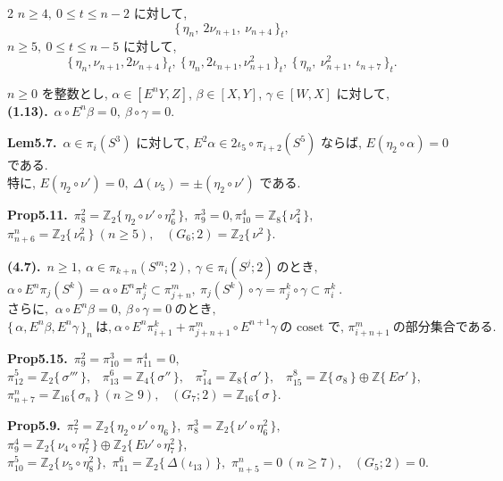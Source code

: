 \documentclass[10pt, leqno]{ltjsarticle}
\newcommand{\Ex}{E}        %
\newcommand{\todai}[2][]{\{\,#2\,\}_{#1}}      %
\newcommand{\gen}[1]{\{\,#1\,\}}       %
\newcommand{\pis}[2]{\pi_{#1}(#2)}       %
\newcommand{\pit}[2]{\pi_{#1}^{#2}}
\numberwithin{equation}{section}
\theoremstyle{plain}
\theoremstyle{definition}
\theoremstyle{remark}
\begin{document}
\begin{paracol}{2}
\noindent
\(n\ge4,\ 0\le t\le n-2\) に対して, 
\[
\todai[t]{\eta_n,\ 2\nu_{n+1},\ \nu_{n+4}},
\]
\(n\ge5,\ 0\le t\le n-5\) に対して, 
\[
\todai[t]{\eta_n, \nu_{n+1}, 2\nu_{n+4}},\
\todai[t]{\eta_n, 2\iota_{n+1}, \nu_{n+1}^2},\
\todai[t]{\eta_n,\ \nu_{n+1}^{2},\ \iota_{n+7}} .
\]

\switchcolumn

\noindent
$n\ge 0$ を整数とし, 
$\alpha\in[\Ex^n Y, Z]$, $\beta\in[X, Y]$, $\gamma\in[W, X]$ に対して,\\
\textbf{(1.13).}\
\(\alpha\circ \Ex^n\beta=0,\ \beta\circ \gamma=0\).

\noindent
\textbf{Lem5.7.}\
\(\alpha\in\pi_i(S^3)\) に対して,
\(E^2\alpha\in2\iota_5\circ\pi_{i+2}(S^5)\) ならば, 
\(E(\eta_2\circ\alpha)=0\) である. \\
特に, \(E(\eta_2\circ\nu')=0, \ \Delta(\nu_5)=\pm(\eta_2\circ\nu')\) である. 

\noindent
\textbf{Prop5.11.}\
\(\pi^{2}_{8}=\mathbb Z_2\gen{\eta_{2}\circ\nu'\circ\eta_6^2},\)\quad 
\(\pi^{3}_{9}=0,\)\quad \(\pi^{4}_{10}=\mathbb Z_8\gen{\nu_{4}^2},\) \\
\(\pi^{n}_{n+6}=\mathbb Z_2\gen{\nu_n^2}\ (n\ge5),\) \
\((G_{6};2)=\mathbb Z_2\gen{\nu^2}.\)

\noindent
\textbf{(4.7).}\
\(n\ge1, \ \alpha\in\pis{k+n}{S^m; 2},\ \gamma\in\pis{i}{S^j; 2}
    \ \text{のとき, }\)\\
\(\alpha\circ E^n\pis{j}{S^k} = \alpha\circ E^n \pit{j}{k}
  \subset \pit{j+n}{m},
  \ \pis{j}{S^k}\circ\gamma = \pit{j}{k}\circ\gamma \subset\pit{i}{k}\ . \)\\
\(\text{さらに, }\ \alpha\circ E^n\beta=0,\ \beta\circ\gamma = 0 \ \text{のとき, }\)\\
\(\todai[n]{\alpha, E^n\beta, E^n\gamma}\ \text{は,}\
  \alpha\circ E^n\pit{i+1}{k} + \pit{j+n+1}{m}\circ E^{n+1}\gamma\
  \text{の coset で, }\pit{i+n+1}{m} \ \text{の部分集合である. }\)

\noindent
\textbf{Prop5.15.}\
\(\pi_9^2=\pi_{10}^3=\pi_{11}^4=0,\) \\
\(\pi^{5}_{12}=\mathbb Z_2\gen{\sigma'''},\) \
\(\pi^{6}_{13}=\mathbb Z_4\gen{\sigma''},\) \
\(\pi^{7}_{14}=\mathbb Z_8\gen{\sigma'},\) \
\(\pi^{8}_{15}=\mathbb Z\gen{\sigma_8}\oplus\mathbb Z\gen{E\sigma'},\) \\
\(\pi^{n}_{n+7}=\mathbb Z_{16}\gen{\sigma_n}\ (n\ge9),\) \
\((G_{7};2)=\mathbb Z_{16}\gen{\sigma}.\)

\noindent
\textbf{Prop5.9.}\
\(\pi^{2}_{7}=\mathbb Z_2\gen{\eta_{2}\circ\nu'\circ\eta_6},\) \quad
\(\pi^{3}_{8}=\mathbb Z_2\gen{\nu'\circ\eta_6^2},\) \quad
\(\pi^{4}_{9}=\mathbb Z_2\gen{\nu_{4}\circ\eta_7^2}\oplus \mathbb Z_2\gen{E\nu'\circ\eta_7^2},\) \\
\(\pi^{5}_{10}=\mathbb Z_2\gen{\nu_{5}\circ\eta_8^2},\) \quad
\(\pi^{6}_{11}=\mathbb Z_2\gen{\Delta(\iota_{13})},\) \quad
\(\pi^{n}_{n+5}=0\ (n\ge7),\) \
\((G_{5};2)=0.\)


\end{paracol}
\end{document}
